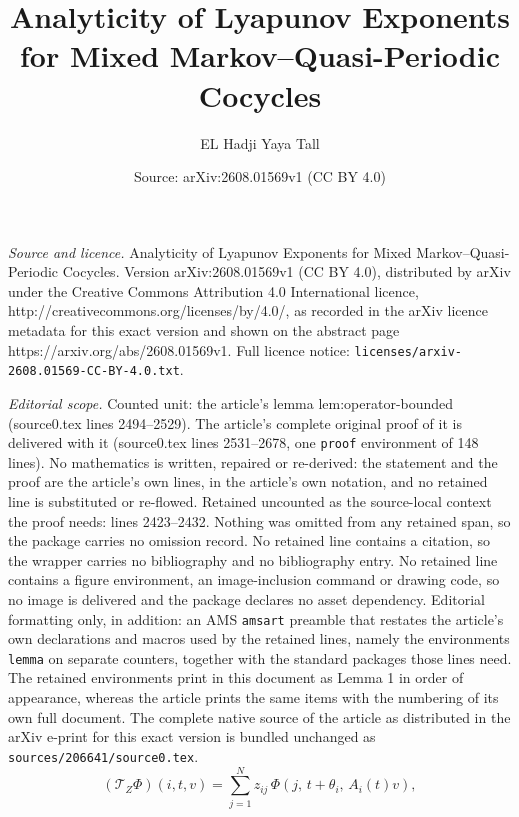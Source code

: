 \documentclass[10pt,a4paper]{amsart}
\title{Analyticity of Lyapunov Exponents for Mixed Markov--Quasi-Periodic Cocycles}
\author{EL Hadji Yaya Tall}
\date{Source: arXiv:2608.01569v1 (CC BY 4.0)}
\begin{document}
\maketitle

\noindent\emph{Source and licence.} Analyticity of Lyapunov Exponents for Mixed Markov--Quasi-Periodic Cocycles. Version arXiv:2608.01569v1 (CC BY 4.0), distributed by arXiv under the Creative Commons Attribution 4.0 International licence, http://creativecommons.org/licenses/by/4.0/, as recorded in the arXiv licence metadata for this exact version and shown on the abstract page https://arxiv.org/abs/2608.01569v1. Full licence notice: \texttt{licenses/arxiv-2608.01569-CC-BY-4.0.txt}.\par\smallskip

\noindent\textit{Editorial scope.} Counted unit: the article's lemma lem:operator-bounded (source0.tex lines 2494--2529). The article's complete original proof of it is delivered with it (source0.tex lines 2531--2678, one \texttt{proof} environment of 148 lines). No mathematics is written, repaired or re-derived: the statement and the proof are the article's own lines, in the article's own notation, and no retained line is substituted or re-flowed.  Retained uncounted as the source-local context the proof needs: lines 2423--2432.  Nothing was omitted from any retained span, so the package carries no omission record.  No retained line contains a citation, so the wrapper carries no bibliography and no bibliography entry.  No retained line contains a figure environment, an image-inclusion command or drawing code, so no image is delivered and the package declares no asset dependency.  Editorial formatting only, in addition: an AMS \texttt{amsart} preamble that restates the article's own declarations and macros used by the retained lines, namely the environments \texttt{lemma} on separate counters, together with the standard packages those lines need.  The retained environments print in this document as Lemma 1 in order of appearance, whereas the article prints the same items with the numbering of its own full document.  The complete native source of the article as distributed in the arXiv e-print for this exact version is bundled unchanged as \texttt{sources/206641/source0.tex}.
\begin{equation}\label{eq:forward-Markov-operator}
 (\mathcal T_Z\Phi)(i,t, v)
 =
 \sum_{j=1}^Nz_{ij}\,
 \Phi\left(
 j,\,
 t+\theta_i,\,
 A_i(t)v
 \right),
\end{equation}
\end{document}
